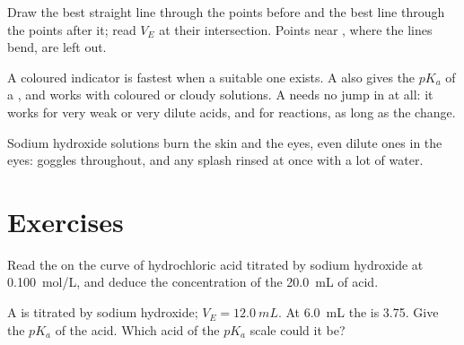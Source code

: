 \begin{method}\label{met:g12:ph-conductivity-titrations:two-lines}
Draw the best straight line through the points before  and
the best line through the points after it; read $V_E$ at their
intersection. Points near , where the lines bend, are left
out.
\end{method}

\begin{remark}\label{rem:g12:ph-conductivity-titrations:which}
A coloured indicator is fastest when a suitable one exists. A  also gives the $pK_a$ of a , and works with coloured
or cloudy solutions. A  needs no jump in  at
all: it works for very weak or very dilute acids, and for 
reactions, as long as the  change.
\end{remark}

\begin{safety}{}
Sodium hydroxide solutions burn the skin and the eyes, even dilute ones
in the eyes: goggles throughout, and any splash rinsed at once with a
lot of water.
\end{safety}

\section{Exercises}


\begin{exercise}[$\star$]\label{exo:g12:ph-conductivity-titrations:1}
Read the  on the curve of hydrochloric acid titrated by
sodium hydroxide at \qty{0.100}{mol/L}, and deduce the concentration of
the \qty{20.0}{mL} of acid.
\end{exercise}

\begin{exercise}[$\star$]\label{exo:g12:ph-conductivity-titrations:2}
A  is titrated by sodium hydroxide; $V_E = \qty{12.0}{mL}$. At
\qty{6.0}{mL} the  is 3.75. Give the $pK_a$ of the acid. Which acid of
the $pK_a$ scale could it be?
\end{exercise}

